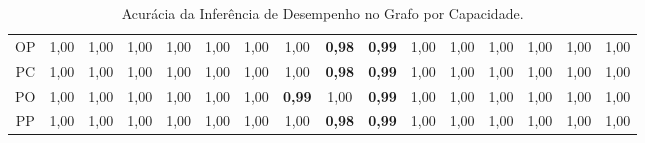 \begin{table}[t]
{\begin{tabular}{|c|c|c|c|c|c|c|c|c|c|c|c|c|c|c|c|}
    OP    & 1,00  & 1,00  & 1,00  & 1,00  & 1,00  & 1,00  & 1,00  & \textbf{\color{red}0,98}  & \textbf{\color{red}0,99}  & 1,00  & 1,00  & 1,00  & 1,00  & 1,00  & 1,00 \\
    PC    & 1,00  & 1,00  & 1,00  & 1,00  & 1,00  & 1,00  & 1,00  & \textbf{\color{red}0,98}  & \textbf{\color{red}0,99}  & 1,00  & 1,00  & 1,00  & 1,00  & 1,00  & 1,00 \\
    PO    & 1,00  & 1,00  & 1,00  & 1,00  & 1,00  & 1,00  & \textbf{\color{red}0,99}  & 1,00  & \textbf{\color{red}0,99}  & 1,00  & 1,00  & 1,00  & 1,00  & 1,00  & 1,00 \\
    PP    & 1,00  & 1,00  & 1,00  & 1,00  & 1,00  & 1,00  & 1,00  & \textbf{\color{red}0,98}  & \textbf{\color{red}0,99}  & 1,00  & 1,00  & 1,00  & 1,00  & 1,00  & 1,00 \\
    \hline
    \end{tabular}%
    }%
  \caption{\label{table:acuracia_capacidade}Acurácia da Inferência de Desempenho no Grafo por Capacidade.}
\end{table}%

